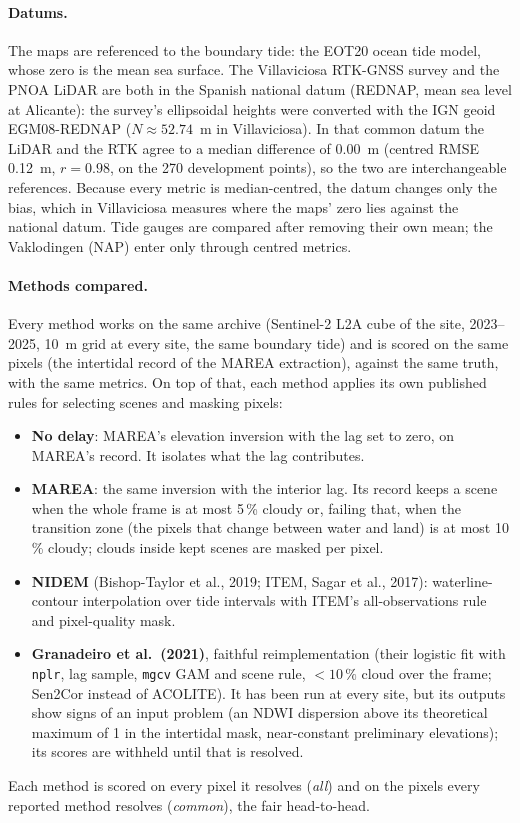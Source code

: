 \documentclass[11pt,a4paper]{article}
\begin{document}
\paragraph{Datums.} The maps are referenced to the boundary tide: the EOT20
ocean tide model, whose zero is the mean sea surface. The Villaviciosa
RTK-GNSS survey and the PNOA LiDAR are both in the Spanish national datum
(REDNAP, mean sea level at Alicante): the survey's ellipsoidal heights
were converted with the IGN geoid EGM08-REDNAP ($N \approx 52.74$~m in
Villaviciosa). In that common datum the LiDAR and the RTK agree to a
median difference of 0.00~m (centred RMSE 0.12~m, $r = 0.98$, on the 270
development points), so the two are interchangeable references. Because
every metric is median-centred, the datum changes only the bias, which in
Villaviciosa measures where the maps' zero lies against the national
datum. Tide gauges are compared after removing their own mean; the
Vaklodingen (NAP) enter only through centred metrics.

\paragraph{Methods compared.} Every method works on the same archive
(Sentinel-2 L2A cube of the site, 2023--2025, 10~m grid at every site, the
same boundary tide) and is scored on the same pixels (the intertidal
record of the MAREA extraction), against the same truth, with the same
metrics. On top of that, each method applies its own published rules for
selecting scenes and masking pixels:
\begin{itemize}
\item \textbf{No delay}: MAREA's elevation inversion with the lag set to
  zero, on MAREA's record. It isolates what the lag contributes.
\item \textbf{MAREA}: the same inversion with the interior lag. Its record
  keeps a scene when the whole frame is at most 5\,\% cloudy or, failing
  that, when the transition zone (the pixels that change between water and
  land) is at most 10\,\% cloudy; clouds inside kept scenes are masked per
  pixel.
\item \textbf{NIDEM} (Bishop-Taylor et al., 2019; ITEM, Sagar et al.,
  2017): waterline-contour interpolation over tide intervals with ITEM's
  all-observations rule and pixel-quality mask.
\item \textbf{Granadeiro et al.\ (2021)}, faithful reimplementation (their
  logistic fit with \texttt{nplr}, lag sample, \texttt{mgcv} GAM and scene
  rule, $<10\,\%$ cloud over the frame; Sen2Cor instead of ACOLITE). It has
  been run at every site, but its outputs show signs of an input problem
  (an NDWI dispersion above its theoretical maximum of 1 in the intertidal
  mask, near-constant preliminary elevations); its scores are withheld
  until that is resolved.
\end{itemize}
Each method is scored on every pixel it resolves (\emph{all}) and on the
pixels every reported method resolves (\emph{common}), the fair
head-to-head.
\end{document}
